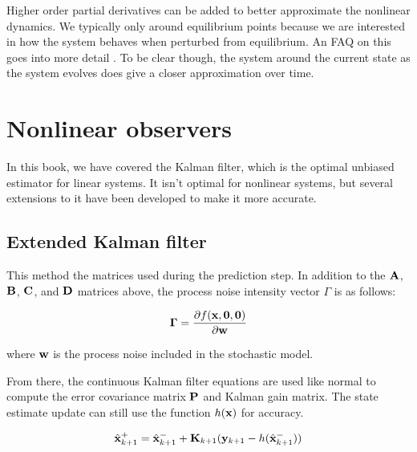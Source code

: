 Higher order partial derivatives can be added to better approximate the
nonlinear dynamics. We typically only  around
equilibrium points because we are interested in how the \gls{system} behaves
when perturbed from equilibrium. An FAQ on this goes into more detail
\cite{bib:linearize-equilibrium-point}. To be clear though,
 the \gls{system} around the current
\gls{state} as the \gls{system} evolves does give a closer approximation over
time.

\section{Nonlinear observers}

In this book, we have covered the Kalman filter, which is the optimal unbiased
estimator for linear \glspl{system}. It isn't optimal for nonlinear
\glspl{system}, but several extensions to it have been developed to make it more
accurate.

\subsection{Extended Kalman filter}

This method  the matrices used during the
prediction step. In addition to the $\mathbf{A}$, $\mathbf{B}$, $\mathbf{C}$, and
$\mathbf{D}$ matrices above, the process noise intensity vector $\Gamma$ is
 as follows:

\begin{equation*}
  \mathbf{\Gamma} = \frac{\partial f(\mathbf{x}, \mathbf{0}, \mathbf{0})}{\partial \mathbf{w}}
\end{equation*}

where $\mathbf{w}$ is the process noise included in the stochastic model.

From there, the continuous Kalman filter equations are used like normal to
compute the error covariance matrix $\mathbf{P}$ and Kalman gain matrix. The
\gls{state} estimate update can still use the function $h(\mathbf{x})$ for
accuracy.

\begin{equation*}
  \hat{\mathbf{x}}_{k+1}^+ = \hat{\mathbf{x}}_{k+1}^- +
    \mathbf{K}_{k+1}(\mathbf{y}_{k+1} - h(\hat{\mathbf{x}}_{k+1}^-))
\end{equation*}

